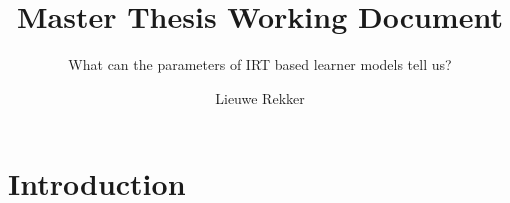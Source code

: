 \documentclass{scrartcl}
\providecommand{\comm}[1]{{\textbf[ #1 ]}}
\providecommand{\commd}[1]{\comm{D: {#1}}}
\begin{document}
 
\title{Master Thesis Working Document}
\subtitle{What can the parameters of IRT based learner models tell us?}
\author{Lieuwe Rekker}
\maketitle
\nocite{labelcombi}
\nocite{lftransfer}
\nocite{importance}
\nocite{knowledgeproblem}
\nocite{modelreview}
\nocite{eirt}
\nocite{pfa}
\nocite{ktpfa}
\nocite{skillcombi}
\nocite{lfa}
\nocite{blackart}
\nocite{hambleton}
\nocite{bridge}
\nocite{ct}
\nocite{algebra}


\section{Introduction}

\end{document}
